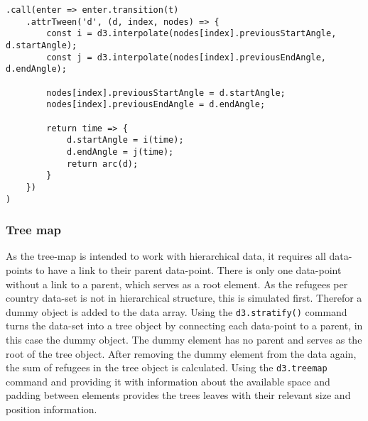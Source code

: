 \begin{minipage}{0.9\linewidth}
    \begin{lstlisting}[style=htmlcssjs, captionpos=b, caption={The implementation of the arc update animations. There are two interpolate functions defined in the beginning. They are called \texttt{i} and \texttt{j}. Next the new values for start and end angle are stored on the node itself. This needs to be done to be able to reference these values again for the next update, as the previous angles will not be accessible through the pie object after regenerating it for an update. Finally the function which is called for each frame of the animation is defined and returned. This function first interpolates the start and end angle values using the previously defined functions and the time of time which has already pased in the animation. This time value is in the range of zero to one, depending on how far along the animation is. These newly interpolated angles define the start and end angle of the pie piece, which is then turned into a path element by calling the \texttt{arc} function for this pie piece.}, label={lst:donut-chart}]
.call(enter => enter.transition(t)
    .attrTween('d', (d, index, nodes) => {
        const i = d3.interpolate(nodes[index].previousStartAngle, d.startAngle);
        const j = d3.interpolate(nodes[index].previousEndAngle, d.endAngle);

        nodes[index].previousStartAngle = d.startAngle;
        nodes[index].previousEndAngle = d.endAngle;

        return time => {
            d.startAngle = i(time);
            d.endAngle = j(time);
            return arc(d);
        }
    })
)
    \end{lstlisting}
\end{minipage}


\subsubsection{Tree map}
As the tree-map is intended to work with hierarchical data, it requires all data-points to have a link to their parent data-point. There is only one data-point without a link to a parent, which serves as a root element. As the refugees per country data-set is not in hierarchical structure, this is simulated first. Therefor a dummy object is added to the data array. Using the \texttt{d3.stratify()} command turns the data-set into a tree object by connecting each data-point to a parent, in this case the dummy object. The dummy element has no parent and serves as the root of the tree object. After removing the dummy element from the data again, the sum of refugees in the tree object is calculated. Using the \texttt{d3.treemap} command and providing it with information about the available space and padding between elements provides the trees leaves with their relevant size and position information.

